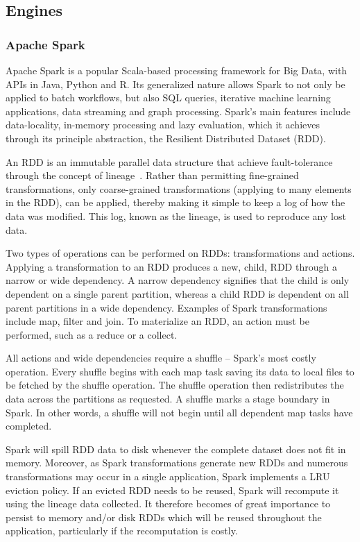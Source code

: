 \documentclass{IEEEtran}
\newcommand{\todo}[1]{\marginpar{\parbox{18mm}{\flushleft\tiny\color{red}\textbf{TODO}:
      #1}}}
\begin{document}
\subsection{Engines} %

\subsubsection{Apache Spark}

Apache Spark is a popular Scala-based processing framework for Big Data, with
APIs in Java, Python and R. Its 
generalized nature allows Spark to not only be applied to batch workflows,
but also SQL queries, iterative machine learning applications, 
data streaming and graph processing. Spark's
main features include data-locality, in-memory processing and lazy evaluation,
which it achieves through its principle abstraction, the Resilient Distributed 
Dataset (RDD). 

An RDD is an immutable parallel data structure that achieve fault-tolerance 
through the concept of lineage~\cite{zaharia2010spark}. Rather than permitting
fine-grained transformations, only coarse-grained transformations (applying to
many elements in the RDD), can be applied, thereby making it simple to keep a 
log of how the data was modified. This log, known as the lineage, is used
to reproduce any lost data.

Two types of operations can be performed on RDDs:
transformations and actions. Applying a transformation to an RDD produces a new,
child, RDD through a narrow or wide dependency. A narrow dependency signifies 
that the child is only dependent on a single parent partition, whereas a child 
RDD is dependent on all parent partitions in a wide dependency. Examples of 
Spark transformations include map, filter and join. To materialize an RDD, an
action must be performed, such as a reduce or a collect.

All actions and wide dependencies require a shuffle -- Spark's most costly
operation. Every shuffle begins with each map task saving its data to local
files to be fetched by the shuffle operation. The shuffle operation then 
redistributes the data across the partitions as requested. A shuffle marks a 
stage boundary in Spark. In other words, a shuffle will not begin until all 
dependent map tasks \todo{shouldn't it be 'actions'?} have completed.

Spark will spill RDD data to disk whenever the complete dataset does not fit in
memory. Moreover, as Spark transformations generate new RDDs and numerous 
transformations may occur in a single application, Spark implements a LRU eviction
policy. If an evicted RDD needs to be reused, Spark will recompute it using the
lineage data collected. It therefore becomes of great importance to persist to
memory and/or 
disk RDDs which will be reused throughout the application, particularly if the
recomputation is costly. 
\end{document}
